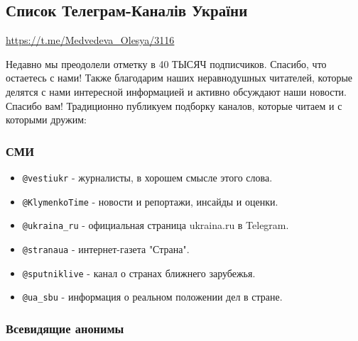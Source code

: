  
 
 

\subsection{Список Телеграм-Каналів України}
\label{sec:tg.list}

\url{https://t.me/Medvedeva_Olesya/3116}

Недавно мы преодолели отметку в 40 ТЫСЯЧ подписчиков. Спасибо, что остаетесь с
нами! Также благодарим наших неравнодушных читателей, которые делятся с нами
интересной информацией и активно обсуждают наши новости. Спасибо вам!
Традиционно публикуем подборку каналов, которые читаем и с которыми дружим:

\subsubsection{СМИ}

\begin{itemize}
\item \verb|@vestiukr| - журналисты, в хорошем смысле этого слова.
\item \verb|@KlymenkoTime| - новости и репортажи, инсайды и оценки.
\item \verb|@ukraina_ru| - официальная страница ukraina.ru в Telegram.
\item \verb|@stranaua| -  интернет-газета "Страна".
\item \verb|@sputniklive| - канал о странах ближнего зарубежья. 
\item \verb|@ua_sbu| - информация о реальном положении дел в стране.
\end{itemize}

\subsubsection{Всевидящие анонимы}

